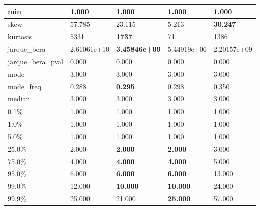 \begin{table}[H]
\begin{tabular}{|l|m{10em}|m{10em}|m{10em}|m{10em}|}
\hline min & 1.000 & 1.000 & 1.000 & 1.000 \\
\hline skew & 57.785 & 23.115 & \cellcolor[rgb]{0.9, 0.54, 0.52} 5.213 & \bfseries 30.247 \\
\hline kurtosis & 5331 & \bfseries 1737 & \cellcolor[rgb]{0.9, 0.54, 0.52} 71 & 1386 \\
\hline jarque\_bera & 2.61061e+10 & \bfseries 3.45846e+09 & \cellcolor[rgb]{0.9, 0.54, 0.52} 5.44919e+06 & 2.20157e+09 \\
\hline jarque\_bera\_pval & 0.000 & 0.000 & 0.000 & 0.000 \\
\hline mode & 3.000 & 3.000 & 3.000 & 3.000 \\
\hline mode\_freq & 0.288 & \bfseries 0.295 & 0.298 & \cellcolor[rgb]{0.9, 0.54, 0.52} 0.350 \\
\hline median & 3.000 & 3.000 & 3.000 & 3.000 \\
\hline 0.1\% & 1.000 & 1.000 & 1.000 & 1.000 \\
\hline 1.0\% & 1.000 & 1.000 & 1.000 & 1.000 \\
\hline 5.0\% & 1.000 & 1.000 & 1.000 & 1.000 \\
\hline 25.0\% & 2.000 & \bfseries 2.000 & \bfseries 2.000 & \cellcolor[rgb]{0.9, 0.54, 0.52} 3.000 \\
\hline 75.0\% & 4.000 & \bfseries 4.000 & \bfseries 4.000 & \cellcolor[rgb]{0.9, 0.54, 0.52} 5.000 \\
\hline 95.0\% & 6.000 & \bfseries 6.000 & \bfseries 6.000 & \cellcolor[rgb]{0.9, 0.54, 0.52} 13.000 \\
\hline 99.0\% & 12.000 & \bfseries 10.000 & \bfseries 10.000 & \cellcolor[rgb]{0.9, 0.54, 0.52} 24.000 \\
\hline 99.9\% & 25.000 & 21.000 & \bfseries 25.000 & \cellcolor[rgb]{0.9, 0.54, 0.52} 57.000 \\
\hline
\end{tabular}
\end{table}
